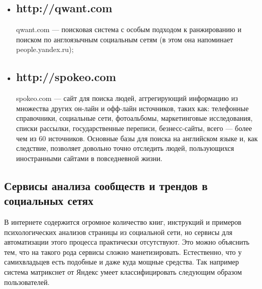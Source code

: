 \begin{chap1}
\begin{itemize}
Он делает некоторое количество синтетических пометки , чтобы извлечь тему из твита сделать тему для поиска , а также выполняет классификацию контента, где есть больше текста , чтобы играть с , для ссылок , упомянутых в чириканье. Он понимает, что автор отличается от того, что обсуждается и который имеет в виду которых в почтовых отправлений , которые питаются в его графике влияния , который занимает ссылки в результатах поиска на основе влияния людей, говорящих о этих связей . Это включает в себя глобальную звание пользователем , независимо от темы и сроки , а также ряды на уровне ключевых слов на основе того, что было в чириканье , когда они получили внимание на это
C 2012 года партнер Яндекс, в 2013 куплена Apple за  \$200 мл;
\item \subsection{http://qwant.com}
qwant.com — поисковая система с особым подходом к ранжированию и поиском по англоязычным социальным сетям (в этом она напоминает people.yandex.ru);
\item \subsection{http://spokeo.com}
spokeo.com — сайт для поиска людей, аггрегирующий информацию из множества других он-лайн и офф-лайн источников, таких как: телефонные справочники, социальные сети, фотоальбомы, маркетинговые исследования, списки рассылки, государственные переписи, безнесс-сайты, всего — более чем из 60 источников. Основные базы для поиска на английском языке и, как следствие, позволяет довольно точно отследить людей, пользующихся иностранными сайтами в повседневной жизни.
\end{itemize}

\subsection{Сервисы анализа сообществ и трендов в социальных сетях}
В интернете содержится огромное количество книг, инструкций и примеров психологических анализов страницы из социальной сети, но сервисы для автоматизации этого процесса практически отсутствуют. Это можно объяснить тем, что на такого рода сервисы сложно манетизировать. Естественно, что у самихвладьцев есть подобные и даже куда мощные средства. Так например система матрикснет от Яндекс умеет классифицировать следующим образом пользователей.\\ %


\end{chap1}
